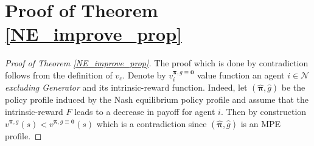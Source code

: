 \documentclass{article}
\begin{document}
\section*{Proof of Theorem \ref{NE_improve_prop}}
\begin{proof}[Proof of Theorem \ref{NE_improve_prop}]
The proof which is done by contradiction follows from the definition of $v_c$.
Denote by $v^{\boldsymbol{\pi},g\equiv \boldsymbol{0}}_i$  value function an agent $i\in\mathcal{N}$ \textit{excluding {\selectfont Generator}} and its intrinsic-reward function. 
Indeed, 
let $(\boldsymbol{\hat{\pi}},\hat{g})$ be the policy profile induced by the Nash equilibrium policy profile and assume that the intrinsic-reward $F$ leads to a decrease in payoff for agent $i$. Then by construction 
$    v^{\boldsymbol{\pi},g}(s)< v^{\boldsymbol{\pi},g\equiv \boldsymbol{0}}(s)
$
which is a contradiction since $(\boldsymbol{\hat{\pi}},\hat{g})$ is an MPE profile.
\end{proof}
\end{document}
